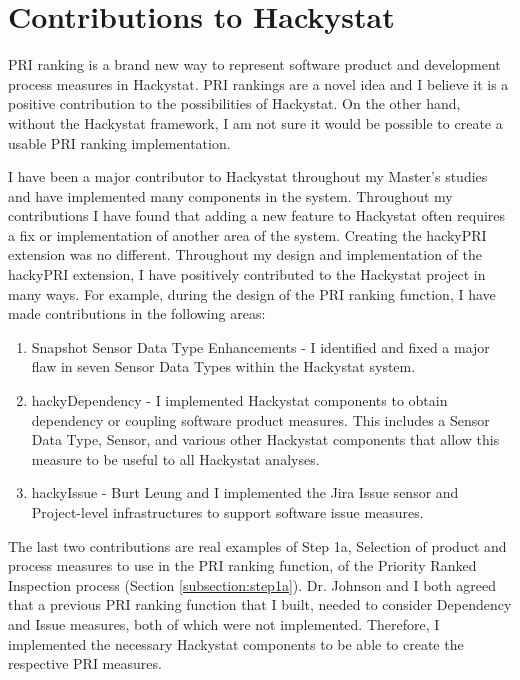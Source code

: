 \section{Contributions to Hackystat}
\label{section:contributions}
PRI ranking is a brand new way to represent software product and
development process measures in Hackystat. PRI rankings are a novel idea
and I believe it is a positive contribution to the possibilities of
Hackystat. On the other hand, without the Hackystat framework, I am not
sure it would be possible to create a usable PRI ranking implementation.

I have been a major contributor to Hackystat throughout my Master's studies
and have implemented many components in the system. Throughout my
contributions I have found that adding a new feature to Hackystat often
requires a fix or implementation of another area of the system. Creating
the hackyPRI extension was no different. Throughout my design and
implementation of the hackyPRI extension, I have positively contributed to
the Hackystat project in many ways. For example, during the design of the
PRI ranking function, I have made contributions in the following areas:

\begin{enumerate}
\item Snapshot Sensor Data Type Enhancements \cite{SnapshotEnhancement} - I
  identified and fixed a major flaw in seven Sensor Data Types within the
  Hackystat system.
\item hackyDependency - I implemented Hackystat components to obtain
  dependency or coupling software product measures. This includes a Sensor
  Data Type, Sensor, and various other Hackystat components that allow this 
  measure to be useful to all Hackystat analyses.
\item hackyIssue - Burt Leung and I implemented the Jira Issue sensor and
  Project-level infrastructures to support software issue measures.
\end{enumerate}

The last two contributions are real examples of Step 1a, Selection of
product and process measures to use in the PRI ranking function, of the
Priority Ranked Inspection process (Section \ref{subsection:step1a}). Dr.
Johnson and I both agreed that a previous PRI ranking function that I built,
needed to consider Dependency and Issue measures, both of which were not
implemented. Therefore, I implemented the necessary Hackystat components to
be able to create the respective PRI measures.

